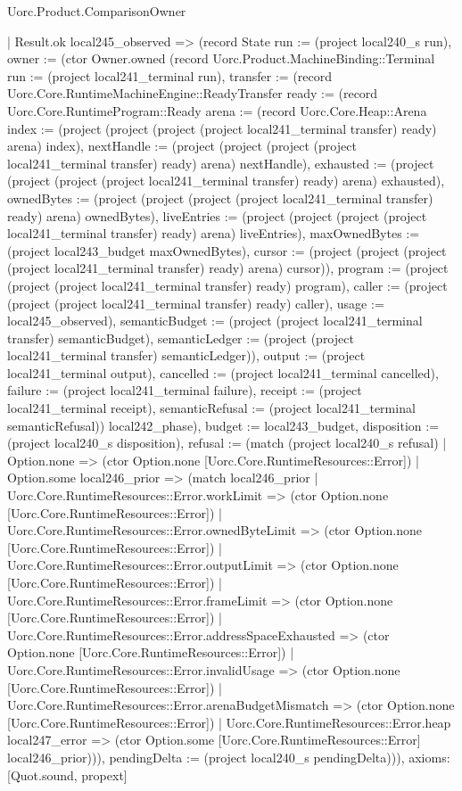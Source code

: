 \begin{lexlean}{Uorc.Product.ComparisonOwner}
\begin{semanticmodule}
{    | Result.ok local245_observed => (record State {run := (project local240_s run), owner := (ctor Owner.owned (record Uorc.Product.MachineBinding::Terminal {run := (project local241_terminal run), transfer := (record Uorc.Core.RuntimeMachineEngine::ReadyTransfer {ready := (record Uorc.Core.RuntimeProgram::Ready {arena := (record Uorc.Core.Heap::Arena {index := (project (project (project (project local241_terminal transfer) ready) arena) index), nextHandle := (project (project (project (project local241_terminal transfer) ready) arena) nextHandle), exhausted := (project (project (project (project local241_terminal transfer) ready) arena) exhausted), ownedBytes := (project (project (project (project local241_terminal transfer) ready) arena) ownedBytes), liveEntries := (project (project (project (project local241_terminal transfer) ready) arena) liveEntries), maxOwnedBytes := (project local243_budget maxOwnedBytes), cursor := (project (project (project (project local241_terminal transfer) ready) arena) cursor)}), program := (project (project (project local241_terminal transfer) ready) program), caller := (project (project (project local241_terminal transfer) ready) caller), usage := local245_observed}), semanticBudget := (project (project local241_terminal transfer) semanticBudget), semanticLedger := (project (project local241_terminal transfer) semanticLedger)}), output := (project local241_terminal output), cancelled := (project local241_terminal cancelled), failure := (project local241_terminal failure), receipt := (project local241_terminal receipt), semanticRefusal := (project local241_terminal semanticRefusal)}) local242_phase), budget := local243_budget, disposition := (project local240_s disposition), refusal := (match (project local240_s refusal)
      | Option.none => (ctor Option.none [Uorc.Core.RuntimeResources::Error])
      | Option.some local246_prior => (match local246_prior
        | Uorc.Core.RuntimeResources::Error.workLimit => (ctor Option.none [Uorc.Core.RuntimeResources::Error])
        | Uorc.Core.RuntimeResources::Error.ownedByteLimit => (ctor Option.none [Uorc.Core.RuntimeResources::Error])
        | Uorc.Core.RuntimeResources::Error.outputLimit => (ctor Option.none [Uorc.Core.RuntimeResources::Error])
        | Uorc.Core.RuntimeResources::Error.frameLimit => (ctor Option.none [Uorc.Core.RuntimeResources::Error])
        | Uorc.Core.RuntimeResources::Error.addressSpaceExhausted => (ctor Option.none [Uorc.Core.RuntimeResources::Error])
        | Uorc.Core.RuntimeResources::Error.invalidUsage => (ctor Option.none [Uorc.Core.RuntimeResources::Error])
        | Uorc.Core.RuntimeResources::Error.arenaBudgetMismatch => (ctor Option.none [Uorc.Core.RuntimeResources::Error])
        | Uorc.Core.RuntimeResources::Error.heap local247_error => (ctor Option.some [Uorc.Core.RuntimeResources::Error] local246_prior))), pendingDelta := (project local240_s pendingDelta)})),
  axioms: [Quot.sound, propext]
}


\end{semanticmodule}
\end{lexlean}
